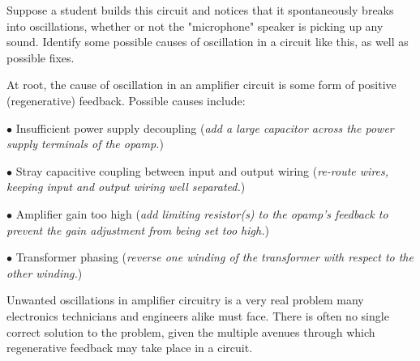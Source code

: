

Suppose a student builds this circuit and notices that it spontaneously breaks into oscillations, whether or not the "microphone" speaker is picking up any sound.  Identify some possible causes of oscillation in a circuit like this, as well as possible fixes.







At root, the cause of oscillation in an amplifier circuit is some form of positive (regenerative) feedback.  Possible causes include:

\medskip
\goodbreak
\item{$\bullet$} Insufficient power supply decoupling ({\it add a large capacitor across the power supply terminals of the opamp.})
\item{$\bullet$} Stray capacitive coupling between input and output wiring ({\it re-route wires, keeping input and output wiring well separated.})
\item{$\bullet$} Amplifier gain too high ({\it add limiting resistor(s) to the opamp's feedback to prevent the gain adjustment from being set too high.})
\item{$\bullet$} Transformer phasing ({\it reverse one winding of the transformer with respect to the other winding.})
\medskip







Unwanted oscillations in amplifier circuitry is a very real problem many electronics technicians and engineers alike must face.  There is often no single correct solution to the problem, given the multiple avenues through which regenerative feedback may take place in a circuit.




